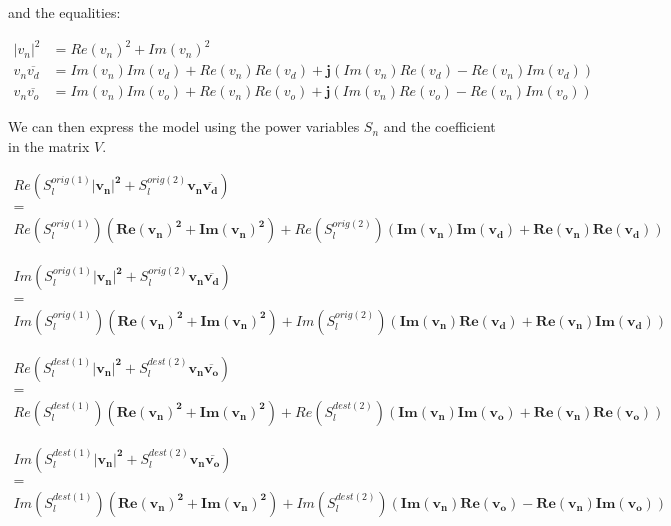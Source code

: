 \documentclass{article}
\begin{document}
and the equalities:

\[
    \begin{array}{lll}
        |v_n|^2 &= Re(v_n)^2 + Im(v_n)^2 \\
        v_n\overline{v_d} &= Im(v_n)Im(v_d) + Re(v_n)Re(v_d) + \mathbf{j}(Im(v_n)Re(v_d) - Re(v_n)Im(v_d)) \\
        v_n\overline{v_o} &= Im(v_n)Im(v_o) + Re(v_n)Re(v_o) + \mathbf{j}(Im(v_n)Re(v_o) - Re(v_n)Im(v_o))
    \end{array}
\]

We can then express the model using the power variables \(S_n\) and the coefficient in the matrix \(V\).

\[
    \begin{array}{c}
        Re(S^{orig(1)}_l\mathbf{|v_n|^2} + S^{orig(2)}_l\mathbf{v_n\overline{v_d}})\\
        =\\
        Re(S^{orig(1)}_l)(\mathbf{Re(v_n)^2} + \mathbf{Im(v_n)^2}) + Re(S^{orig(2)}_l)(\mathbf{Im(v_n)Im(v_d)} + \mathbf{Re(v_n)Re(v_d)})
    \end{array}
\]

\[
    \begin{array}{c}
        Im(S^{orig(1)}_l\mathbf{|v_n|^2} + S^{orig(2)}_l\mathbf{v_n\overline{v_d}})\\
        =\\
        Im(S^{orig(1)}_l)(\mathbf{Re(v_n)^2} + \mathbf{Im(v_n)^2}) + Im(S^{orig(2)}_l)(\mathbf{Im(v_n)Re(v_d)} + \mathbf{Re(v_n)Im(v_d)})
    \end{array}
\]

\[
    \begin{array}{c}
        Re(S^{dest(1)}_l\mathbf{|v_n|^2} + S^{dest(2)}_l\mathbf{v_n\overline{v_o}})\\
        =\\
        Re(S^{dest(1)}_l)(\mathbf{Re(v_n)^2} + \mathbf{Im(v_n)^2}) + Re(S^{dest(2)}_l)(\mathbf{Im(v_n)Im(v_o)} + \mathbf{Re(v_n)Re(v_o)})
    \end{array}
\]

\[
    \begin{array}{c}
        Im(S^{dest(1)}_l\mathbf{|v_n|^2} + S^{dest(2)}_l\mathbf{v_n\overline{v_o}})\\
        =\\
        Im(S^{dest(1)}_l)(\mathbf{Re(v_n)^2} + \mathbf{Im(v_n)^2}) + Im(S^{dest(2)}_l)(\mathbf{Im(v_n)Re(v_o)} - \mathbf{Re(v_n)Im(v_o)})
    \end{array}
\]
\end{document}
